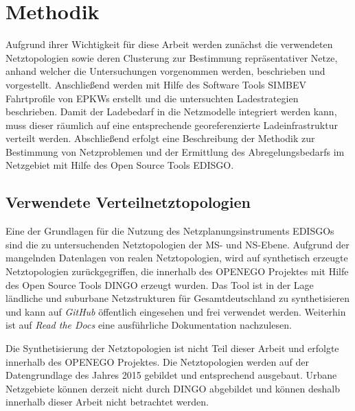 \section{Methodik}\label{chap:Methodik}

Aufgrund ihrer Wichtigkeit für diese Arbeit werden zunächst die verwendeten Netztopologien sowie deren Clusterung zur Bestimmung repräsentativer Netze, anhand welcher die Untersuchungen vorgenommen werden, beschrieben und vorgestellt.
Anschließend werden mit Hilfe des Software Tools \gls{SIMBEV} Fahrtprofile von \glspl{EPKW} erstellt und die untersuchten Ladestrategien beschrieben.
Damit der Ladebedarf in die Netzmodelle integriert werden kann, muss dieser räumlich auf eine entsprechende georeferenzierte Ladeinfrastruktur verteilt werden.
Abschließend erfolgt eine Beschreibung der Methodik zur Bestimmung von Netzproblemen und der Ermittlung des Abregelungsbedarfs im Netzgebiet mit Hilfe des Open Source Tools \gls{EDISGO}.


\subsection{Verwendete Verteilnetztopologien}\label{chap:dingo_theo}

Eine der Grundlagen für die Nutzung des Netzplanungsinstruments \glspl{EDISGO} sind die zu untersuchenden Netztopologien der \gls{MS}- und \gls{NS}-Ebene.
Aufgrund der mangelnden Datenlagen von realen Netztopologien, wird auf synthetisch erzeugte Netztopologien zurückgegriffen, die innerhalb des \gls{OPENEGO} Projektes \cite{Mueller2019} mit Hilfe des Open Source Tools \gls{DINGO} erzeugt wurden.
Das Tool ist in der Lage ländliche und suburbane Netzstrukturen für Gesamtdeutschland zu synthetisieren und kann auf \textit{GitHub} \cite{dingo2019} öffentlich eingesehen und frei verwendet werden.
Weiterhin ist auf \textit{Read the Docs} \cite{dingo-docs2019} eine ausführliche Dokumentation nachzulesen.\medskip

Die Synthetisierung der Netztopologien ist nicht Teil dieser Arbeit und erfolgte innerhalb des \gls{OPENEGO} Projektes.
Die Netztopologien werden auf der Datengrundlage des Jahres \num{2015} gebildet und entsprechend ausgebaut.
Urbane Netzgebiete können derzeit nicht durch \gls{DINGO} abgebildet und können deshalb innerhalb dieser Arbeit nicht betrachtet werden.\medskip

